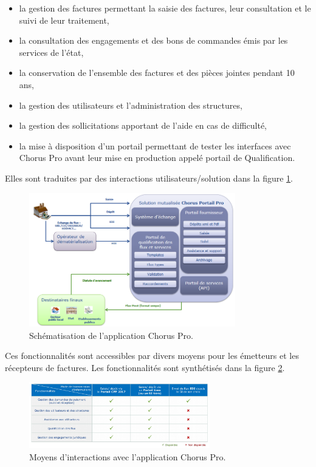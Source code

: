 \documentclass[12pt,a4paper]{article}
\begin{document}
\smallbreak
\begin{itemize}
\item la gestion des factures permettant la saisie des factures, leur consultation et le suivi de leur traitement,
\item la consultation des engagements et des bons de commandes émis par les
services de l’état,
\item la conservation de l’ensemble des factures et des pièces jointes pendant 10 ans,
\item la gestion des utilisateurs et l'administration des structures,
\item la gestion des sollicitations apportant de l'aide en cas de difficulté,
\item la mise à disposition d'un portail permettant de tester les interfaces avec Chorus Pro avant leur mise en production appelé portail de Qualification.
\end{itemize}
\medbreak
Elles sont traduites par des interactions utilisateurs/solution dans la figure \ref{schematisation}.
\bigbreak
\begin{figure}[H]
	\begin{center}
		\includegraphics[width=0.8\textwidth,height=\textheight,keepaspectratio]{solutionSimplifiee.png}
		\caption{Schématisation de l'application Chorus Pro.}
		\label{schematisation}
	\end{center}
\end{figure}
\clearpage
\newpage
Ces fonctionnalités sont accessibles par divers moyens pour les émetteurs et les récepteurs de factures. Les fonctionnalités sont synthétisés dans la figure \ref{tableauMoyens}.
\begin{figure}[H]
	\begin{center}
		\includegraphics[width=0.7\textwidth,height=\textheight,keepaspectratio]{tableauMoyensFonctionnalites.png}
		\caption{Moyens d'interactions avec l'application Chorus Pro.}
		\label{tableauMoyens}
	\end{center}
\end{figure}
\end{document}
